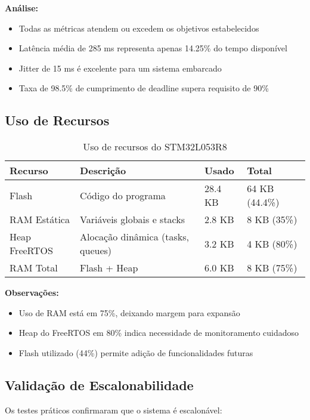 \documentclass[12pt,a4paper]{article}
\begin{document}
\textbf{Análise:}
\begin{itemize}
    \item Todas as métricas atendem ou excedem os objetivos estabelecidos
    \item Latência média de 285 ms representa apenas 14.25\% do tempo disponível
    \item Jitter de 15 ms é excelente para um sistema embarcado
    \item Taxa de 98.5\% de cumprimento de deadline supera requisito de 90\%
\end{itemize}

\subsection{Uso de Recursos}

\begin{table}[H]
\centering
\begin{tabularx}{\textwidth}{lXll}
\toprule
\textbf{Recurso} & \textbf{Descrição} & \textbf{Usado} & \textbf{Total} \\
\midrule
Flash & Código do programa & 28.4 KB & 64 KB (44.4\%) \\
RAM Estática & Variáveis globais e stacks & 2.8 KB & 8 KB (35\%) \\
Heap FreeRTOS & Alocação dinâmica (tasks, queues) & 3.2 KB & 4 KB (80\%) \\
RAM Total & Flash + Heap & 6.0 KB & 8 KB (75\%) \\
\bottomrule
\end{tabularx}
\caption{Uso de recursos do STM32L053R8}
\end{table}

\textbf{Observações:}
\begin{itemize}
    \item Uso de RAM está em 75\%, deixando margem para expansão
    \item Heap do FreeRTOS em 80\% indica necessidade de monitoramento cuidadoso
    \item Flash utilizado (44\%) permite adição de funcionalidades futuras
\end{itemize}

\subsection{Validação de Escalonabilidade}

Os testes práticos confirmaram que o sistema é escalonável:
\end{document}

